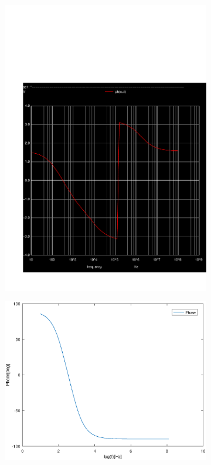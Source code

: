 \begin{figure}[ht]
\centering
\begin{subfigure}{.5\textwidth}
  \centering
  \includegraphics[width=0.9\linewidth]{../sim/phase.pdf}
\end{subfigure}%
\begin{subfigure}{.5\textwidth}
  \centering
  \vspace{3cm}
  \includegraphics[width=1\linewidth]{phaseteo.eps}
\end{subfigure}
\end{figure}
